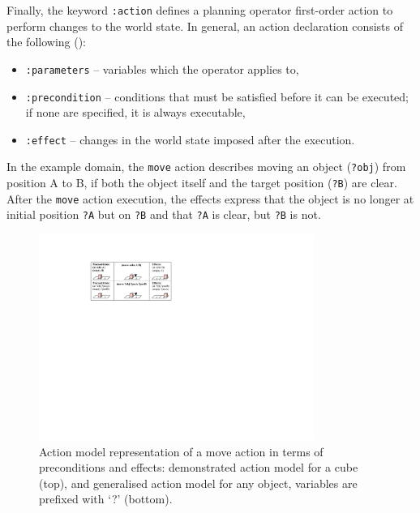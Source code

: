 Finally, the keyword \texttt{:action} defines a planning operator \ie first-order action to perform changes to the world state.
In general, an action declaration consists of the following ():
\begin{itemize}
	\item \texttt{:parameters} -- variables which the operator applies to,
	\item \texttt{:precondition} -- conditions that must be satisfied before it can be executed; if none are specified, it is always executable,
	\item \texttt{:effect} -- changes in the world state imposed after the execution.
\end{itemize}

In the example domain, the \texttt{move} action describes moving an object (\texttt{?obj}) from position A to B, if both the object itself and the target position (\texttt{?B}) are clear.
After the \texttt{move} action execution, the effects express that the object is no longer at initial position \texttt{?A} but on \texttt{?B} and that \texttt{?A} is clear, but \texttt{?B} is not.

\begin{figure}[h]
	\centering
	\includegraphics[width=0.8\textwidth]{figures/schema-logic}
	\caption{Action model representation of a move action in terms of preconditions and effects: demonstrated action model for a cube (top), and generalised action model for any object, variables are prefixed with `?' (bottom).}
	\label{fig:action model}
\end{figure}



